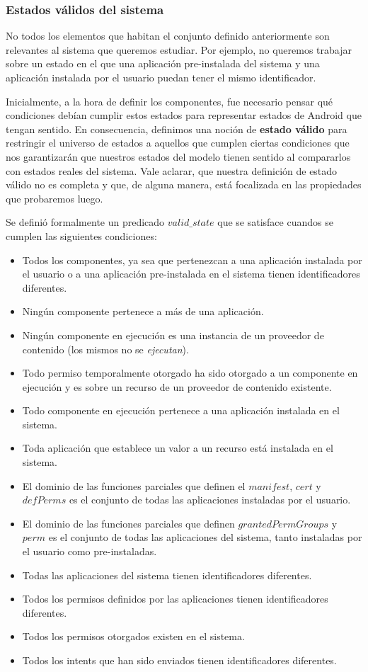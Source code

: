 \subsubsection{Estados válidos del sistema}
No todos los elementos que habitan el conjunto definido anteriormente son relevantes al sistema que
queremos estudiar. Por ejemplo, no queremos trabajar sobre un estado en el que una aplicación
pre-instalada del sistema y una aplicación instalada por el usuario puedan tener el mismo
identificador.

Inicialmente, a la hora de definir los componentes, fue necesario pensar qué condiciones debían
cumplir estos estados para representar estados de Android que tengan sentido. En consecuencia,
definimos una noción de \textbf{estado válido} para restringir el universo de estados a aquellos que
cumplen ciertas condiciones que nos garantizarán que nuestros estados del modelo tienen sentido al
compararlos con estados reales del sistema. Vale aclarar, que nuestra definición de estado válido no
es completa y que, de alguna manera, está focalizada en las propiedades que probaremos luego.

Se definió formalmente un predicado $valid\_state$ que se satisface cuandos se cumplen las siguientes
condiciones:

\begin{itemize}
    \item Todos los componentes, ya sea que pertenezcan a una aplicación instalada por el usuario o a
          una aplicación pre-instalada en el sistema tienen identificadores diferentes.
    \item Ningún componente pertenece a más de una aplicación.
    \item Ningún componente en ejecución es una instancia de un proveedor de contenido (los mismos no se \textit{ejecutan}).
    \item Todo permiso temporalmente otorgado ha sido otorgado a un componente en ejecución y es sobre
          un recurso de un proveedor de contenido existente.
    \item Todo componente en ejecución pertenece a una aplicación instalada en el sistema.
    \item Toda aplicación que establece un valor a un recurso está instalada en el sistema.
    \item El dominio de las funciones parciales que definen el $manifest$, $cert$ y $defPerms$ es el
          conjunto de todas las aplicaciones instaladas por el usuario.
    \item El dominio de las funciones parciales que definen $grantedPermGroups$ y $perm$ es el
          conjunto de todas las aplicaciones del sistema, tanto instaladas por el usuario como
          pre-instaladas.
    \item Todas las aplicaciones del sistema tienen identificadores diferentes.
    \item Todos los permisos definidos por las aplicaciones tienen identificadores diferentes.
    \item Todos los permisos otorgados existen en el sistema.
    \item Todos los intents que han sido enviados tienen identificadores diferentes.
\end{itemize}

